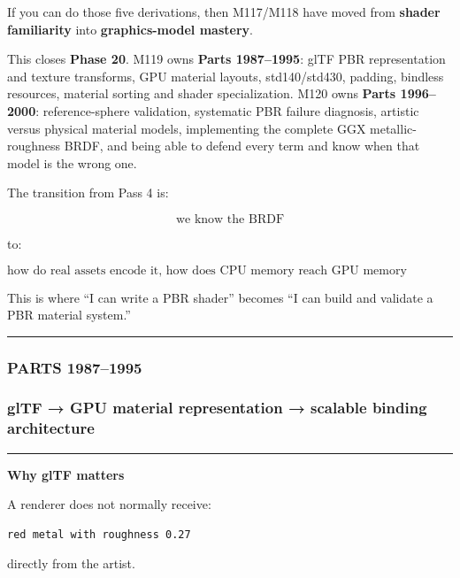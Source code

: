 If you can do those five derivations, then M117/M118 have moved from \textbf{shader familiarity} into \textbf{graphics-model mastery}.

This closes \textbf{Phase 20}. M119 owns \textbf{Parts 1987--1995}: glTF PBR representation and texture transforms, GPU material layouts, std140/std430, padding, bindless resources, material sorting and shader specialization. M120 owns \textbf{Parts 1996--2000}: reference-sphere validation, systematic PBR failure diagnosis, artistic versus physical material models, implementing the complete GGX metallic-roughness BRDF, and being able to defend every term and know when that model is the wrong one.

The transition from Pass 4 is:

\[
\boxed{
\text{we know the BRDF}
}
\]

to:

\[
\boxed{
\text{how do real assets encode it, how does CPU memory reach GPU memory correctly, how do thousands of materials scale, and how do we prove the resulting renderer is actually correct?}
}
\]

This is where ``I can write a PBR shader'' becomes ``I can build and validate a PBR material system.''

\begin{center}\rule{0.5\linewidth}{0.5pt}\end{center}

\subsubsection{PARTS 1987--1995}\label{parts-19871995}

\subsubsection{glTF → GPU material representation → scalable binding architecture}\label{gltf-gpu-material-representation-scalable-binding-architecture}

\begin{center}\rule{0.5\linewidth}{0.5pt}\end{center}

\textbf{Why glTF matters}

A renderer does not normally receive:

\begin{verbatim}
red metal with roughness 0.27
\end{verbatim}

directly from the artist.

